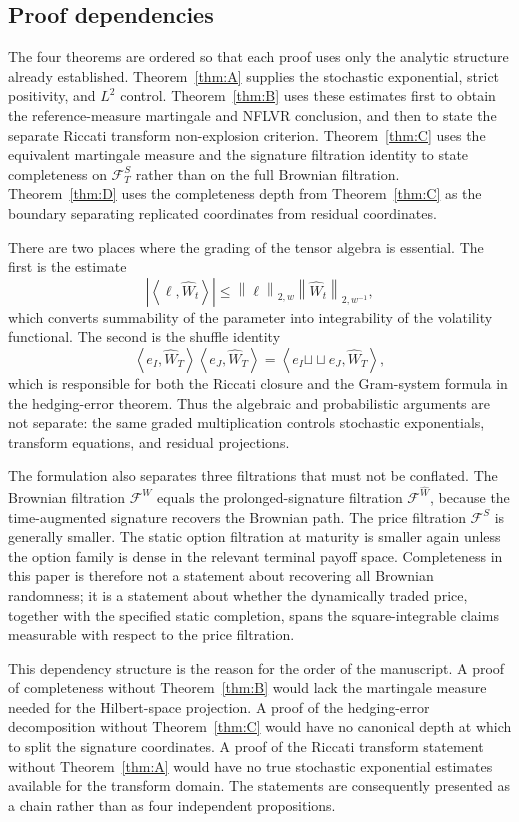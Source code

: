 \documentclass[11pt,oneside]{article}
\theoremstyle{plain}
\theoremstyle{definition}
\theoremstyle{remark}
\newcommand{\cW}{\widehat W}
\newcommand{\FWh}{\mathcal F^{\widehat W}}
\newcommand{\FW}{\mathcal F^W}
\newcommand{\FS}{\mathcal F^S}
\newcommand{\sh}{\mathbin{\sqcup\!\sqcup}}
\newcommand{\norm}[1]{\left\lVert #1\right\rVert}
\newcommand{\abs}[1]{\left\lvert #1\right\rvert}
\newcommand{\inner}[2]{\left\langle #1,#2\right\rangle}
\begin{document}
\subsection{Proof dependencies}
\label{subsec:proof-dependencies}
The four theorems are ordered so that each proof uses only the analytic structure already established. Theorem~\ref{thm:A} supplies the stochastic exponential, strict positivity, and $L^2$ control. Theorem~\ref{thm:B} uses these estimates first to obtain the reference-measure martingale and NFLVR conclusion, and then to state the separate Riccati transform non-explosion criterion. Theorem~\ref{thm:C} uses the equivalent martingale measure and the signature filtration identity to state completeness on $\FS_T$ rather than on the full Brownian filtration. Theorem~\ref{thm:D} uses the completeness depth from Theorem~\ref{thm:C} as the boundary separating replicated coordinates from residual coordinates.

There are two places where the grading of the tensor algebra is essential. The first is the estimate
\[
\abs{\inner{\ell}{\cW_t}}
\leq \norm{\ell}_{2,w}\norm{\cW_t}_{2,w^{-1}},
\]
which converts summability of the parameter into integrability of the volatility functional. The second is the shuffle identity
\[
\inner{e_I}{\cW_T}\inner{e_J}{\cW_T}=\inner{e_I\sh e_J}{\cW_T},
\]
which is responsible for both the Riccati closure and the Gram-system formula in the hedging-error theorem. Thus the algebraic and probabilistic arguments are not separate: the same graded multiplication controls stochastic exponentials, transform equations, and residual projections.

The formulation also separates three filtrations that must not be conflated. The Brownian filtration $\FW$ equals the prolonged-signature filtration $\FWh$, because the time-augmented signature recovers the Brownian path. The price filtration $\FS$ is generally smaller. The static option filtration at maturity is smaller again unless the option family is dense in the relevant terminal payoff space. Completeness in this paper is therefore not a statement about recovering all Brownian randomness; it is a statement about whether the dynamically traded price, together with the specified static completion, spans the square-integrable claims measurable with respect to the price filtration.

This dependency structure is the reason for the order of the manuscript. A proof of completeness without Theorem~\ref{thm:B} would lack the martingale measure needed for the Hilbert-space projection. A proof of the hedging-error decomposition without Theorem~\ref{thm:C} would have no canonical depth at which to split the signature coordinates. A proof of the Riccati transform statement without Theorem~\ref{thm:A} would have no true stochastic exponential estimates available for the transform domain. The statements are consequently presented as a chain rather than as four independent propositions.
\end{document}
